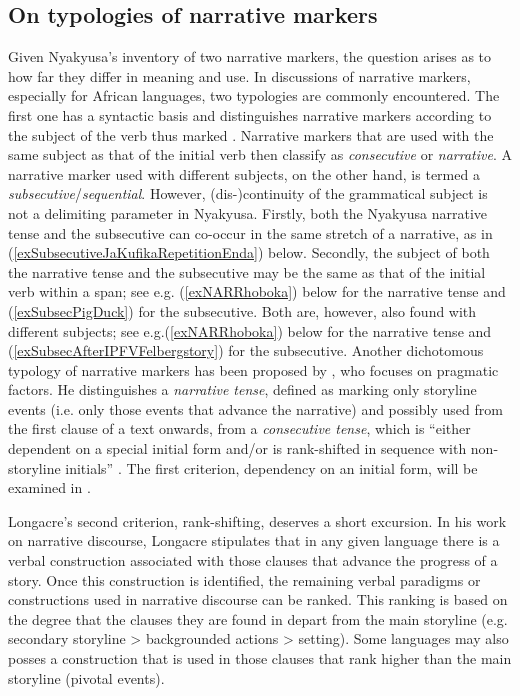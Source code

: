 \subsection{On typologies of narrative markers}\label{NarrativeMarkersTypologies}
Given Nyakyusa's inventory of two narrative markers, the question arises as to how far they differ in meaning and use. In discussions of narrative markers, especially for African languages, two typologies are commonly encountered. The first one has a syntactic basis and distinguishes narrative markers according to the subject of the verb thus marked \citep[19]{RoseEtal2002}. Narrative markers that are used with the same subject as that of the initial verb then classify as \textit{consecutive} or \textit{narrative}. A narrative marker used with different subjects, on the other hand, is termed a \textit{subsecutive}/\textit{sequential}. However, \mbox{(dis-)}continuity of the grammatical subject is not a delimiting parameter in Nyakyusa. Firstly, both the Nyakyusa narrative tense and the subsecutive can co-occur in the same stretch of a narrative, as in (\ref{exSubsecutiveJaKufikaRepetitionEnda}) below. Secondly, the subject of both the narrative tense and the subsecutive may be the same as that of the initial verb within a span; see e.g. (\ref{exNARRhoboka}) below for the narrative tense and (\ref{exSubsecPigDuck}) for the subsecutive. Both are, however, also found with different subjects; see e.g.(\ref{exNARRhoboka}) below for the narrative tense and (\ref{exSubsecAfterIPFVFelbergstory}) for the subsecutive. %
Another dichotomous typology of narrative markers has been proposed by \citet{LongacreR1990}, who focuses on pragmatic factors. He distinguishes a \textit{narrative tense}, defined as marking only storyline events (i.e. only those events that advance the narrative) and possibly used from the first clause of a text onwards, from a \textit{consecutive tense}, which is ``either dependent on a special initial form and/or is rank-shifted in sequence with non-storyline initials'' \citep[109]{LongacreR1990}. The first criterion, dependency on an initial form, will be examined in  .

Longacre's second criterion, rank-shifting, deserves a short excursion. In his work on narrative discourse, Longacre stipulates that in any given language there is a verbal construction associated with those clauses that advance the progress of a story. Once this construction is identified, the remaining verbal paradigms or constructions used in narrative discourse can be ranked. This ranking is based on the degree that the clauses they are found in depart from the main storyline (e.g. secondary storyline > backgrounded actions > setting). Some languages may also posses a construction that is used in those clauses that rank higher than the main storyline (pivotal events). 
